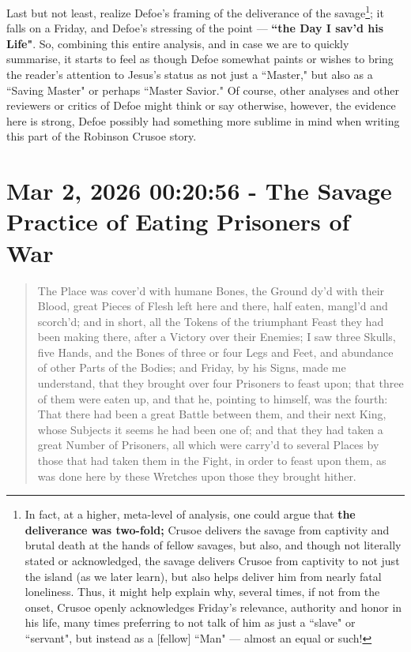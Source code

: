 \documentclass[a4paper]{article}
\begin{document}
Last but not least, realize Defoe's framing of the deliverance of the savage\footnote{In fact, at a higher, meta-level of analysis, one could argue that \textbf{the deliverance was two-fold;} Crusoe delivers the savage from captivity and brutal death at the hands of fellow savages, but also, and though not literally stated or acknowledged, the savage delivers Crusoe from captivity to not just the island (as we later learn), but also helps deliver him from nearly fatal loneliness. Thus, it might help explain why, several times, if not from the onset, Crusoe openly acknowledges Friday's relevance, authority and honor in his life, many times preferring to not talk of him as just a ``slave" or ``servant", but instead as a [fellow] ``Man" --- almost an equal or such!}; it falls on a Friday, and Defoe's stressing of the point --- \textbf{``the Day I sav’d his Life"}. So, combining this entire analysis, and in case we are to quickly summarise, it starts to feel as though Defoe somewhat paints or wishes to bring the reader's attention to Jesus's status as not just a ``Master," but also as a ``Saving Master" or perhaps ``Master Savior." Of course, other analyses and other reviewers or critics of Defoe might think or say otherwise, however, the evidence here is strong, Defoe possibly had something more sublime in mind when writing this part of the Robinson Crusoe story.






\section{Mar 2, 2026 00:20:56 - The Savage Practice of Eating Prisoners of War}
\label{SEC53}


\noindent
\begin{minipage}{1\textwidth}
\vspace{1em}
\begin{quotation}
{\ttfamily


The Place was cover’d with humane Bones, the Ground dy’d with their Blood, great Pieces of Flesh left here and there, half eaten, mangl’d and scorch’d; and in short, all the Tokens of the triumphant Feast they had been making there, after a Victory over their Enemies; I saw three Skulls, five Hands, and the Bones of three or four Legs and Feet, and abundance of other Parts of the Bodies;
and Friday, by his Signs, made me understand, that they brought over four Prisoners to feast upon; that three of them were eaten up, and that he, pointing to himself, was the fourth: That there had been a great Battle between them, and their next King, whose Subjects it seems he had been one of; and that they had taken a great Number of Prisoners, all which were carry’d to several Places by those that had taken them in the Fight, in order to feast upon them, as was done here by these Wretches upon those they brought hither.


}
\end{quotation}
\vspace{1em}
\end{minipage}
\end{document}
